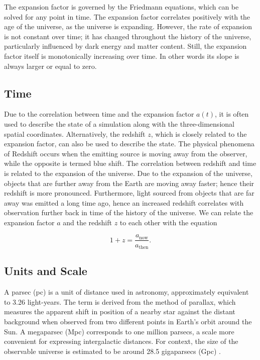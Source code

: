\documentclass{article}
\begin{document}
The expansion factor is governed by the Friedmann equations, which can be solved for any point in time. The expansion factor correlates positively with the age of the universe, as the universe is expanding. However, the rate of expansion is not constant over time; it has changed throughout the history of the universe, particularly influenced by dark energy and matter content. Still, the expansion factor itself is monotonically increasing over time. In other words its slope is always larger or equal to zero.

\subsection{Time}

Due to the correlation between time and the expansion factor \(a(t)\), it is often used to describe the state of a simulation along with the three-dimensional spatial coordinates. Alternatively, the redshift \(z\), which is closely related to the expansion factor, can also be used to describe the state. The physical phenomena of Redshift occurs when the emitting source is moving away from the observer, while the opposite is termed blue shift. The correlation between redshift and time is related to the expansion of the universe. Due to the expansion of the universe, objects that are further away from the Earth are moving away faster; hence their redshift is more pronounced. Furthermore, light sourced from objects that are far away was emitted a long time ago, hence an increased redshift correlates with observation further back in time of the history of the universe. We can relate the expansion factor \(a\) and the redshift \(z\) to each other with the equation

\begin{equation}
    \label{eq:redshift}
    1 + z = \frac{a_{\text{now}}}{a_{\text{then}}}.
\end{equation}

\subsection{Units and Scale}

A parsec (pc) is a unit of distance used in astronomy, approximately equivalent to 3.26 light-years. The term is derived from the method of parallax, which measures the apparent shift in position of a nearby star against the distant background when observed from two different points in Earth's orbit around the Sun. A megaparsec (Mpc) corresponds to one million parsecs, a scale more convenient for expressing intergalactic distances. For context, the size of the observable universe is estimated to be around 28.5 gigaparsecs (Gpc) \citep{bars2010extra}.
\end{document}
